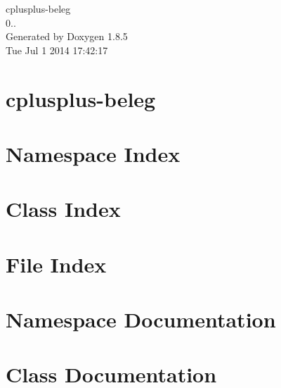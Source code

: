 \documentclass[twoside]{book}
\newcommand{\clearemptydoublepage}{%
  \newpage{\pagestyle{empty}\cleardoublepage}%
}
\begin{document}
\hypersetup{pageanchor=false}
\begin{titlepage}
\vspace*{7cm}
\begin{center}%
{\Large cplusplus-\/beleg \\[1ex]\large 0.. }\\
\vspace*{1cm}
{\large Generated by Doxygen 1.8.5}\\
\vspace*{0.5cm}
{\small Tue Jul 1 2014 17:42:17}\\
\end{center}
\end{titlepage}
\clearemptydoublepage
\tableofcontents
\clearemptydoublepage
{}
\hypersetup{pageanchor=true}

\chapter{cplusplus-\/beleg}
\label{md__d_1_projects_cplusplus_cplusplus-beleg__r_e_a_d_m_e}
\hypertarget{md__d_1_projects_cplusplus_cplusplus-beleg__r_e_a_d_m_e}{}

\chapter{Namespace Index}

\chapter{Class Index}

\chapter{File Index}

\chapter{Namespace Documentation}




\chapter{Class Documentation}






\end{document}
